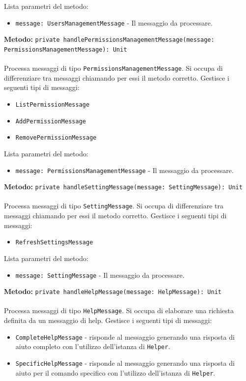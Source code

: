 \documentclass[a4paper]{article}
\begin{document}
			Lista parametri del metodo:
			\begin{itemize}
				\item \texttt{message: UsersManagementMessage} - Il messaggio da processare.
			\end{itemize}
		\textbf{Metodo: }\texttt{private handlePermissionsManagementMessage(message: PermissionsManagementMessage): Unit}
			\\ \\
			Processa messaggi di tipo \texttt{PermissionsManagementMessage}. Si occupa di differenziare tra messaggi chiamando per essi il metodo corretto.
			Gestisce i seguenti tipi di messaggi:
			\begin{itemize}
				\item \texttt{ListPermissionMessage}
				\item \texttt{AddPermissionMessage}
				\item \texttt{RemovePermissionMessage}
			\end{itemize}
			Lista parametri del metodo:
			\begin{itemize}
				\item \texttt{message: PermissionsManagementMessage} - Il messaggio da processare.
			\end{itemize}
		\textbf{Metodo: }\texttt{private handleSettingMessage(message: SettingMessage): Unit}
			\\ \\
			Processa messaggi di tipo \texttt{SettingMessage}. Si occupa di differenziare tra messaggi chiamando per essi il metodo corretto.
			Gestisce i seguenti tipi di messaggi:
			\begin{itemize}
				\item \texttt{RefreshSettingsMessage}
			\end{itemize}
			Lista parametri del metodo:
			\begin{itemize}
				\item \texttt{message: SettingMessage} - Il messaggio da processare.
			\end{itemize}			
		\textbf{Metodo: }\texttt{private handleHelpMessage(message: HelpMessage): Unit}
			\\ \\
			Processa messaggi di tipo \texttt{HelpMessage}. Si occupa di elaborare una richiesta definita da un messaggio di help.
			Gestisce i seguenti tipi di messaggi:
			\begin{itemize}
				\item \texttt{CompleteHelpMessage} - risponde al messaggio generando una risposta di aiuto completo con l'utilizzo dell'istanza di \texttt{Helper}.
				\item \texttt{SpecificHelpMessage} - risponde al messaggio generando una risposta di aiuto per il comando specifico con l'utilizzo dell'istanza di \texttt{Helper}.
			\end{itemize}
\end{document}
